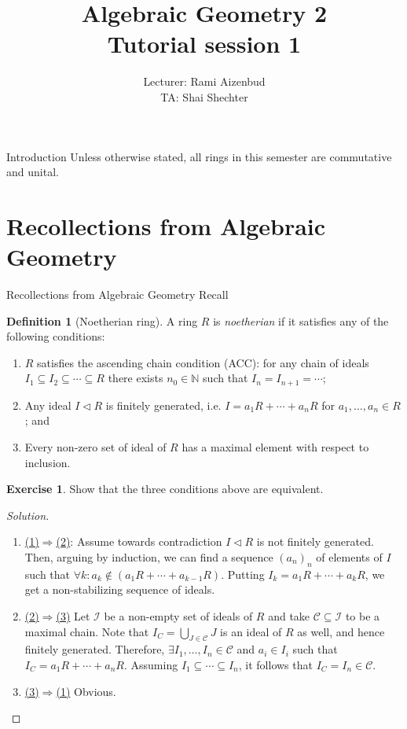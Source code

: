 \documentclass[12pt, draft,reqno,a4paper, twoside]{beamer}
\title{Algebraic Geometry 2\\ Tutorial session 1}
\author{Lecturer: Rami Aizenbud\\TA: Shai Shechter}
\theoremstyle{plain}
\theoremstyle{definition}
\newtheorem{defi}{Definition}
\newtheorem{exer}{Exercise}
\newcommand{\dbN}{\mathbb N}
\newcommand{\mcal}{\mathcal}
\newcommand{\normal}{\triangleleft}
\begin{document}
\frame{\titlepage}

\begin{frame}{Introduction}
Unless otherwise stated, all rings in this semester are commutative and unital.
\end{frame}



\section{Recollections from Algebraic Geometry}
\begin{frame}{Recollections from Algebraic Geometry}
	Recall
	\begin{defi}[Noetherian ring]
		A ring $R$ is \textit{noetherian }if it satisfies any of the following conditions:
		\begin{enumerate}
			\item<1-> $R$ satisfies the ascending chain condition (ACC): for any chain of ideals $I_1\subseteq I_2\subseteq\cdots\subseteq R$ there exists $n_0\in\dbN$ such that $I_n=I_{n+1}=\cdots$;
			\item<2-> Any ideal $I\normal R$ is  finitely generated, i.e. $I=a_1R+\cdots +a_n R$ for $a_1,\ldots,a_n\in R$; and
			\item<3-> Every non-zero set of ideal of $R$ has a maximal element with respect to inclusion.
		\end{enumerate}
	\end{defi}
\end{frame}

\begin{frame}
\begin{exer}Show that the three conditions above are equivalent.
\end{exer}
\begin{proof}[Solution]
	\begin{enumerate}
		\item\underline{(1)$\Rightarrow$(2)}: Assume towards contradiction $I\normal R$ is not finitely generated. \onslide<2-> Then, arguing by induction, we can find a sequence $(a_n)_n$ of elements of $I$ such that $\forall k: a_k\notin (a_1R+\cdots+a_{k-1}R)$. \onslide<3->Putting $I_k=a_1R+\cdots+a_k R$, we get a non-stabilizing sequence of ideals.
		\item<4-> \underline{(2)$\Rightarrow$(3)} Let $\mcal{I}$ be a non-empty set of ideals of $R$ and take $\mcal{C}\subseteq\mcal{I}$ to be a maximal chain. \onslide<5-> Note that $I_C=\bigcup_{J\in\mcal{C}}J$ is an ideal of $R$ as well, and hence finitely generated. Therefore, $\exists I_1,\ldots,I_n\in \mcal{C}$ and $a_i\in I_i$ such that $I_C=a_1R+\cdots +a_n R$. \onslide<6-> Assuming $I_1\subseteq \cdots \subseteq I_n$, it follows that $I_C=I_n\in\mcal{C}$.
		\item<7-> \underline{(3)$\Rightarrow$(1)} Obvious.
	\end{enumerate}
\end{proof}
\end{frame}
\end{document}
